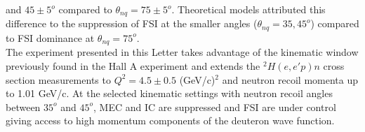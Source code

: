 and $45\pm5^{o}$ compared to  $\theta_{nq}=75\pm5^{o}$. Theoretical models attributed this difference  to the suppression of FSI at the smaller angles ($\theta_{nq}=35, 45^{o}$) compared to FSI
dominance at $\theta_{nq}=75^{o}$\cite{PhysRevLett.107.262501}. \\
\indent The experiment presented in this Letter takes advantage of the kinematic window previously found in the Hall A experiment and extends the $^{2}H(e,e'p)n$ cross section measurements
to $Q^{2}=4.5\pm0.5$ (GeV/c)$^{2}$ and neutron recoil momenta up to 1.01 GeV/c. At the selected kinematic settings with neutron recoil angles between $35^{o}$ and $45^{o}$, MEC and IC are
suppressed and FSI are under control giving access to high momentum components of the deuteron wave function.


